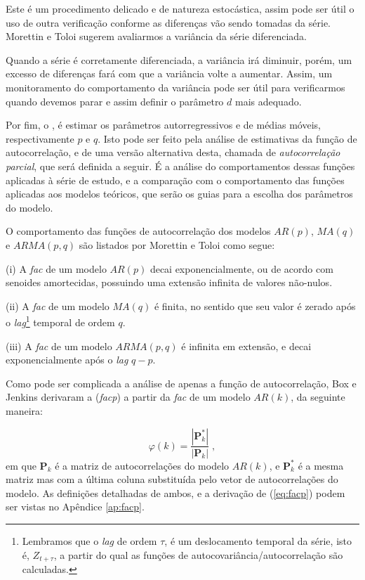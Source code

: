 Este é um procedimento delicado e de natureza estocástica, assim pode ser útil o uso de outra verificação conforme as diferenças vão sendo tomadas da série. Morettin e Toloi \citep{morettin} sugerem avaliarmos a variância da série diferenciada. 

Quando a série é corretamente diferenciada, a variância irá diminuir, porém, um excesso de diferenças fará com que a variância volte a aumentar. Assim, um monitoramento do comportamento da variância pode ser útil para verificarmos quando devemos parar e assim definir o parâmetro $d$ mais adequado.

Por fim, o , é estimar os parâmetros autorregressivos e de médias móveis, respectivamente $p$ e $q$. Isto pode ser feito pela análise de estimativas da função de autocorrelação, e de uma versão alternativa desta, chamada de \emph{autocorrelação parcial}, que será definida a seguir. É a análise do comportamentos dessas funções aplicadas à série de estudo, e a comparação com o comportamento das funções aplicadas aos modelos teóricos, que serão os guias para a escolha dos parâmetros do modelo.

O comportamento das funções de autocorrelação dos modelos $AR(p)$, $MA(q)$ e $ARMA(p, q)$ são listados por Morettin e Toloi \citep{morettin} como segue:
 
(i) A \emph{fac} de um modelo $AR(p)$ decai exponencialmente, ou de acordo com senoides amortecidas, possuindo uma extensão infinita de valores não-nulos.

(ii) A \emph{fac} de um modelo $MA(q)$ é finita, no sentido que seu valor é zerado após o \emph{lag}\footnote{Lembramos que o \emph{lag} de ordem $\tau$, é um deslocamento temporal da série, isto é, $Z_{t{+}\tau}$, a partir do qual as funções de autocovariância/autocorrelação são calculadas.} temporal de ordem $q$.

(iii) A \emph{fac} de um modelo $ARMA(p, q)$ é infinita em extensão, e decai exponencialmente após o \emph{lag} $q{-}p$.

Como pode ser complicada a análise de apenas a função de autocorrelação, Box e Jenkins \citep{box} derivaram a  (\emph{facp}) a partir da \emph{fac} de um modelo $AR(k)$, da seguinte maneira:

\begin{equation}\label{eq:facp}
\varphi(k) = \dfrac{|\mathbf{P}_k^*|}{|\mathbf{P}_k|}\;,
\end{equation}
em que $\mathbf{P}_k$ é a matriz de autocorrelações do modelo $AR(k)$, e $\mathbf{P}_k^*$ é a mesma matriz mas com a última coluna substituída pelo vetor de autocorrelações do modelo. As definições detalhadas de ambos, e a derivação de (\ref{eq:facp}) podem ser vistas no Apêndice \ref{ap:facp}.


